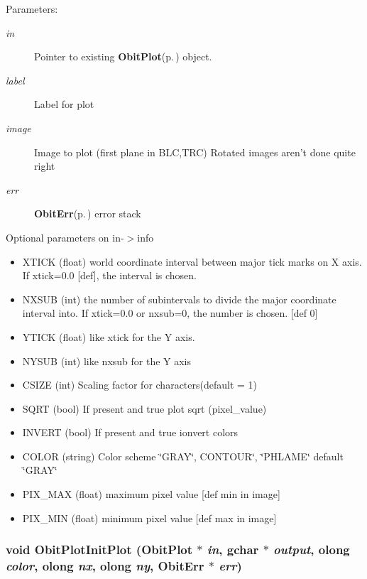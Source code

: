 \begin{Desc}
\item[Parameters:]
\begin{description}
\item[{\em in}]Pointer to existing {\bf Obit\-Plot}{\rm (p.\,\pageref{structObitPlot})} object. \item[{\em label}]Label for plot \item[{\em image}]Image to plot (first plane in BLC,TRC) Rotated images aren't done quite right \item[{\em err}]{\bf Obit\-Err}{\rm (p.\,\pageref{structObitErr})} error stack\end{description}
\end{Desc}
Optional parameters on in-$>$info \begin{itemize}
\item XTICK (float) world coordinate interval between major tick marks on X axis. If xtick=0.0 [def], the interval is chosen. \item NXSUB (int) the number of subintervals to divide the major coordinate interval into. If xtick=0.0 or nxsub=0, the number is chosen. [def 0] \item YTICK (float) like xtick for the Y axis. \item NYSUB (int) like nxsub for the Y axis \item CSIZE (int) Scaling factor for characters(default = 1) \item SQRT (bool) If present and true plot sqrt (pixel\_\-value) \item INVERT (bool) If present and true ionvert colors \item COLOR (string) Color scheme \char`\"{}GRAY\char`\"{}, CONTOUR\char`\"{}, \char`\"{}PHLAME\char`\"{} default \char`\"{}GRAY\char`\"{} \item PIX\_\-MAX (float) maximum pixel value [def min in image] \item PIX\_\-MIN (float) minimum pixel value [def max in image] \end{itemize}
\subsubsection{\setlength{\rightskip}{0pt plus 5cm}void Obit\-Plot\-Init\-Plot ({\bf Obit\-Plot} $\ast$ {\em in}, gchar $\ast$ {\em output}, {\bf olong} {\em color}, {\bf olong} {\em nx}, {\bf olong} {\em ny}, {\bf Obit\-Err} $\ast$ {\em err})}\label{ObitPlot_8h_a5}


